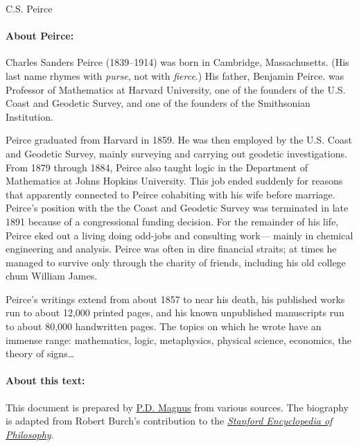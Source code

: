 \documentclass[12pt]{article}
\newcommand*{\authortitle}[1]{\centerline{\Huge\sc #1}}
\begin{document}
\authortitle{C.S. Peirce}

\bigskip

\paragraph{About Peirce:}
Charles Sanders Peirce (1839--1914) was born in Cambridge,
Massachusetts. (His last name rhymes with \emph{purse}, not with \emph{fierce}.) His father, Benjamin Peirce. was Professor of Mathematics at
Harvard University, one of the founders of the U.S. Coast and
Geodetic Survey, and one of the founders of the Smithsonian
Institution.

Peirce graduated from Harvard in 1859. He was then
employed by the U.S. Coast and Geodetic Survey, mainly surveying and
carrying out geodetic investigations. From 1879 through 1884, Peirce
also taught logic in the Department of Mathematics at Johns Hopkins University. This job ended suddenly for reasons that
apparently connected to Peirce cohabiting with his wife before marriage. Peirce's position with the the Coast and Geodetic Survey was
terminated in late 1891 because of a congressional funding decision. For the remainder of his life, Peirce eked out a living doing odd-jobs and consulting work--- mainly in chemical engineering and analysis. Peirce was often in dire financial straits; at times he managed to survive only through the charity of friends, including his old college chum William James.

Peirce's writings extend from about 1857 to near his
death, his published works run to about 12,000 printed pages, and his known unpublished manuscripts run to about 80,000 handwritten pages. The topics on which he wrote have an immense range: mathematics, logic, metaphysics, physical science, economics, the theory of signs\ldots

\paragraph{About this text:}
This document is prepared by \href{https://www.fecundity.com}{P.D. Magnus} from various sources. The biography is adapted from Robert Burch's contribution to the \href{http://plato.stanford.edu}{\emph{Stanford Encyclopedia of Philosophy}}.





\end{document}
